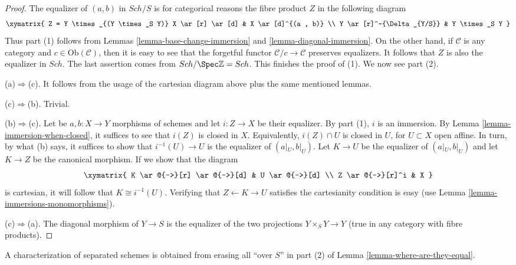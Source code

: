 \begin{proof}
The equalizer of $(a, b)$ in $Sch/S$ is for categorical reasons
the fibre product $Z$ in the following diagram
$$
\xymatrix{
Z = Y \times_{(Y \times_S Y)} X \ar[r] \ar[d] &
 X \ar[d]^{(a , b)} \\
Y \ar[r]^-{\Delta_{Y/S}} & Y \times_S Y
}
$$
Thus part (1) follows from Lemmas
\ref{lemma-base-change-immersion} and \ref{lemma-diagonal-immersion}.
On the other hand, if $\mathcal{C}$ is any category and $c\in\text{Ob}(\mathcal{C})$,
then it is easy to see that the forgetful functor $\mathcal{C}/c\to\mathcal{C}$
preserves equalizers. It follows that $Z$ is also the equalizer in $Sch$.
The last assertion comes from $Sch/\Spec\mathbb{Z}=Sch$.
This finishes the proof of (1). We now see part (2).

\medskip\noindent
(a)$\Rightarrow$(c).
It follows from the usage of the cartesian diagram above plus the same mentioned lemmas.

\medskip\noindent
(c)$\Rightarrow$(b). Trivial.

\medskip\noindent
(b)$\Rightarrow$(c).
Let be $a,b:X\to Y$ morphisms of schemes and let $i:Z\to X$ be their equalizer.
By part (1), $i$ is an immersion. By Lemma \ref{lemma-immersion-when-closed},
it suffices to see that $i(Z)$ is closed in $X$. Equivalently, $i(Z)\cap U$
is closed in $U$, for $U\subset X$ open affine. In turn, by what (b) says,
it suffices to show that $i^{-1}(U)\to U$ is the equalizer of $(a|_U,b|_U)$.
Let $K\to U$ be the equalizer of $(a|_U,b|_U)$ and let $K\to Z$ be the
canonical morphism. If we show that the diagram
$$
\xymatrix{
K \ar@{->}[r] \ar@{->}[d] & U \ar@{->}[d] \\
Z \ar@{->}[r]^i & X
}
$$
is cartesian, it will follow that $K\cong i^{-1}(U)$.
Verifying that $Z\leftarrow K\to U$ satisfies the cartesianity
condition is easy (use Lemma \ref{lemma-immersions-monomorphisms}).

\medskip\noindent
(c)$\Rightarrow$(a).
The diagonal morphism of $Y\to S$ is the equalizer of the two
projections $Y\times_SY\to Y$ (true in any category with fibre products).
\end{proof}

\begin{remark}
\label{remark-where-are-they-equal}
A characterization of separated schemes is obtained from erasing all
``over $S$'' in part (2) of Lemma \ref{lemma-where-are-they-equal}.
\end{remark}

